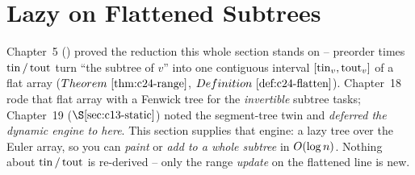\section{Lazy on Flattened Subtrees}\label{sec:c15-trees}

\begin{previouslybox}
Chapter~5 () proved the reduction this whole section stands on -- preorder times \(\operatorname{tin}/\operatorname{tout}\) turn ``the subtree of \(v\)'' into one contiguous interval \([\operatorname{tin}_v,\operatorname{tout}_v]\) of a flat array (\(\thmref{c24-range}\), \(\defref{c24-flatten}\)).  Chapter~18 rode that flat array with a Fenwick tree for the \emph{invertible} subtree tasks; Chapter~19 (\(\secref{c13-static}\)) noted the segment-tree twin and \emph{deferred the dynamic engine to here}.  This section supplies that engine: a lazy tree over the Euler array, so you can \emph{paint} or \emph{add to a whole subtree} in \(O(\log n)\).  Nothing about \(\operatorname{tin}/\operatorname{tout}\) is re-derived -- only the range \emph{update} on the flattened line is new.
\end{previouslybox}

